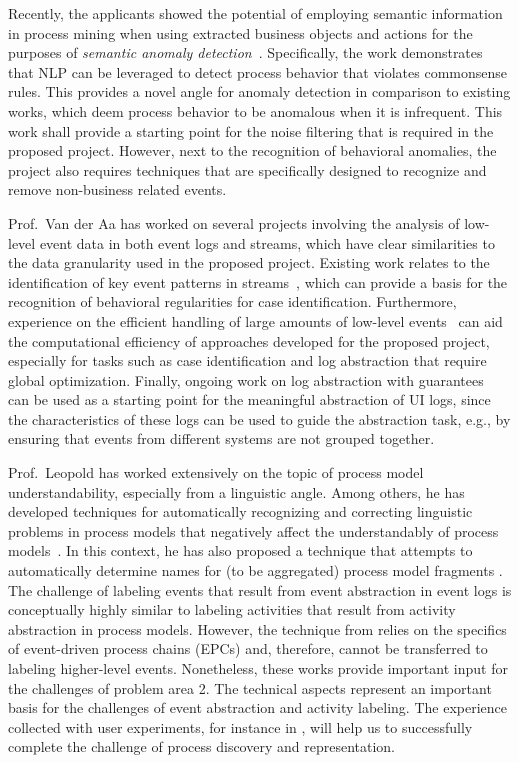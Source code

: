 Recently, the applicants showed the potential of employing semantic information in process mining when using extracted business objects and actions for the purposes of \emph{semantic anomaly detection}~\cite{van2021natural}. Specifically, the work demonstrates that NLP can be leveraged to detect process behavior that violates commonsense rules. This provides a novel angle for anomaly detection in comparison to existing works, which deem process behavior to be anomalous when it is infrequent.
This work shall provide a starting point for the noise filtering that is required in the proposed project. However, next to the recognition of behavioral anomalies, the project also requires techniques that are specifically designed to recognize and remove non-business related events.




Prof.\ Van der Aa has worked on several projects involving the analysis of low-level event data in both event logs and streams, which have clear similarities to the data granularity used in the proposed project.
Existing work relates to the identification of key event patterns in streams~\cite{vanderaa2021cep}, which can provide a basis for the recognition of behavioral regularities for case identification.
Furthermore, experience on the efficient handling of large amounts of low-level events~\cite{zhao2021eires} can aid the computational efficiency of approaches developed for the proposed project, especially for tasks such as case identification and log abstraction that require global optimization.
Finally, ongoing work on log abstraction with guarantees~\cite{rebmann2021icdesubm} can be used as a starting point for the meaningful abstraction of UI logs, since the characteristics of these logs can be used to guide the abstraction task, e.g., by ensuring that events from different systems are not grouped together.

Prof.\ Leopold has worked extensively on the topic of process model understandability, especially from a linguistic angle. Among others, he has developed techniques for automatically recognizing and correcting linguistic problems in process models that negatively affect the understandably of process models~\cite{leopold2013detection,leopold2012refactoring,pittke2015automatic}. In this context, he has also proposed a technique that attempts to automatically determine names for (to be aggregated) process model fragments \cite{leopold2014simplifying}.  The challenge of labeling events that result from event abstraction in event logs is conceptually highly similar to labeling activities that result from activity abstraction in process models. However, the technique from \cite{leopold2014simplifying} relies on the specifics of event-driven process chains (EPCs) and, therefore, cannot be transferred to labeling higher-level events. Nonetheless, these works provide important input for the challenges of problem area 2. The technical aspects represent an important basis for the challenges of event abstraction and activity labeling. The experience collected with user experiments, for instance in \cite{pittke2015automatic}, will help us to successfully complete the challenge of process discovery and representation. 
